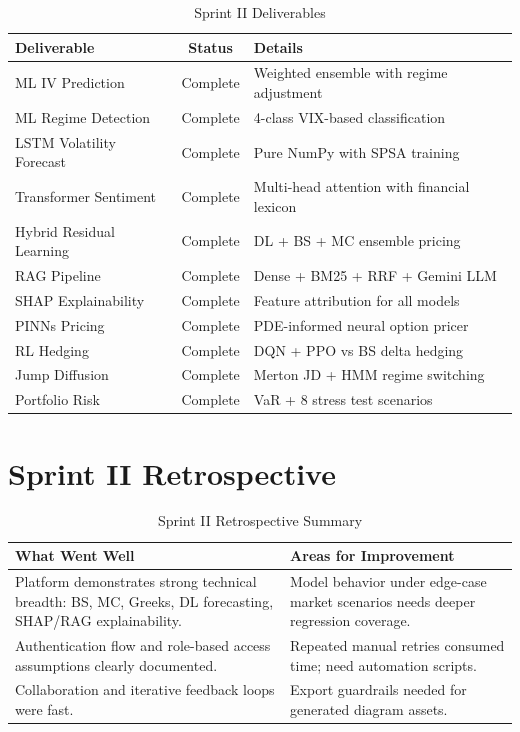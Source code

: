 \documentclass[12pt,a4paper]{report}
\begin{document}
\begin{table}[H]
\centering
\caption{Sprint II Deliverables}
\label{tab:sprint2-outcomes}
\begin{tabularx}{\textwidth}{|l|c|X|}
\hline
\textbf{Deliverable} & \textbf{Status} & \textbf{Details} \\
\hline
ML IV Prediction & Complete & Weighted ensemble with regime adjustment \\
\hline
ML Regime Detection & Complete & 4-class VIX-based classification \\
\hline
LSTM Volatility Forecast & Complete & Pure NumPy with SPSA training \\
\hline
Transformer Sentiment & Complete & Multi-head attention with financial lexicon \\
\hline
Hybrid Residual Learning & Complete & DL + BS + MC ensemble pricing \\
\hline
RAG Pipeline & Complete & Dense + BM25 + RRF + Gemini LLM \\
\hline
SHAP Explainability & Complete & Feature attribution for all models \\
\hline
PINNs Pricing & Complete & PDE-informed neural option pricer \\
\hline
RL Hedging & Complete & DQN + PPO vs BS delta hedging \\
\hline
Jump Diffusion & Complete & Merton JD + HMM regime switching \\
\hline
Portfolio Risk & Complete & VaR + 8 stress test scenarios \\
\hline
\end{tabularx}
\end{table}

\section{Sprint II Retrospective}

\begin{table}[H]
\centering
\caption{Sprint II Retrospective Summary}
\label{tab:sprint2-retro}
\begin{tabularx}{\textwidth}{|X|X|}
\hline
\textbf{What Went Well} & \textbf{Areas for Improvement} \\
\hline
Platform demonstrates strong technical breadth: BS, MC, Greeks, DL forecasting, SHAP/RAG explainability. & Model behavior under edge-case market scenarios needs deeper regression coverage. \\
\hline
Authentication flow and role-based access assumptions clearly documented. & Repeated manual retries consumed time; need automation scripts. \\
\hline
Collaboration and iterative feedback loops were fast. & Export guardrails needed for generated diagram assets. \\
\hline
\end{tabularx}
\end{table}
\end{document}
